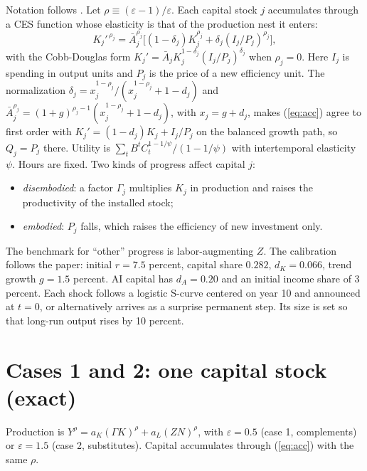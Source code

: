 \documentclass[11pt]{article}
\newcommand{\e}{\varepsilon}
\begin{document}
Notation follows \citet{kiley2000}. Let $\rho\equiv(\e-1)/\e$. Each capital stock $j$
accumulates through a CES function whose elasticity is that of the production nest
it enters:
\begin{equation}
K_j'^{\,\rho_j}=\bar A_j^{\rho_j}\big[(1-\delta_j)K_j^{\rho_j}+\delta_j(I_j/P_j)^{\rho_j}\big],
\label{eq:acc}
\end{equation}
with the Cobb-Douglas form $K_j'=\bar A_jK_j^{1-\delta_j}(I_j/P_j)^{\delta_j}$ when $\rho_j=0$. Here
$I_j$ is spending in output units and $P_j$ is the price of a new efficiency unit.
The normalization
$\delta_j=x_j^{1-\rho_j}/(x_j^{1-\rho_j}+1-d_j)$ and
$\bar A_j^{\rho_j}=(1+g)^{\rho_j-1}(x_j^{1-\rho_j}+1-d_j)$, with $x_j=g+d_j$, makes (\ref{eq:acc})
agree to first order with $K_j'=(1-d_j)K_j+I_j/P_j$ on the balanced growth path, so
$Q_j=P_j$ there. Utility is $\sum_tB^tC_t^{1-1/\psi}/(1-1/\psi)$ with intertemporal
elasticity $\psi$. Hours are fixed. Two kinds of progress affect capital $j$:
\begin{itemize}
\item \emph{disembodied}: a factor $\Gamma_j$ multiplies $K_j$ in production and raises the
productivity of the installed stock;
\item \emph{embodied}: $P_j$ falls, which raises the efficiency of new investment only.
\end{itemize}
The benchmark for ``other'' progress is labor-augmenting $Z$. The calibration follows the
paper: initial $r=7.5$ percent, capital share $0.282$, $d_K=0.066$, trend growth
$g=1.5$ percent. AI capital has $d_A=0.20$ and an initial income share of 3 percent.
Each shock follows a logistic S-curve centered on year 10 and announced at $t=0$, or
alternatively arrives as a surprise permanent step. Its size is set so that long-run
output rises by 10 percent.

\section{Cases 1 and 2: one capital stock (exact)}

Production is $Y^\rho=a_K(\Gamma K)^\rho+a_L(ZN)^\rho$, with $\e=0.5$ (case 1, complements)
or $\e=1.5$ (case 2, substitutes). Capital accumulates through (\ref{eq:acc}) with the same $\rho$.
\end{document}
